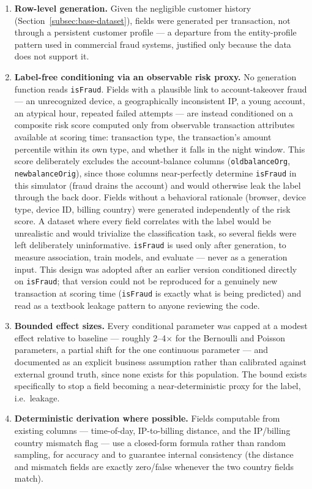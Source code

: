\begin{enumerate}
    \item \textbf{Row-level generation.} Given the negligible customer history (Section~\ref{subsec:base-dataset}), fields were generated per transaction, not through a persistent customer profile --- a departure from the entity-profile pattern used in commercial fraud systems, justified only because the data does not support it.
    \item \textbf{Label-free conditioning via an observable risk proxy.} No generation function reads \texttt{isFraud}. Fields with a plausible link to account-takeover fraud --- an unrecognized device, a geographically inconsistent IP, a young account, an atypical hour, repeated failed attempts --- are instead conditioned on a composite risk score computed only from observable transaction attributes available at scoring time: transaction type, the transaction's amount percentile within its own type, and whether it falls in the night window. This score deliberately excludes the account-balance columns (\texttt{oldbalanceOrg}, \texttt{newbalanceOrig}), since those columns near-perfectly determine \texttt{isFraud} in this simulator (fraud drains the account) and would otherwise leak the label through the back door. Fields without a behavioral rationale (browser, device type, device ID, billing country) were generated independently of the risk score. A dataset where every field correlates with the label would be unrealistic and would trivialize the classification task, so several fields were left deliberately uninformative. \texttt{isFraud} is used only after generation, to measure association, train models, and evaluate --- never as a generation input. This design was adopted after an earlier version conditioned directly on \texttt{isFraud}; that version could not be reproduced for a genuinely new transaction at scoring time (\texttt{isFraud} is exactly what is being predicted) and read as a textbook leakage pattern to anyone reviewing the code.
    \item \textbf{Bounded effect sizes.} Every conditional parameter was capped at a modest effect relative to baseline --- roughly 2--4\(\times\) for the Bernoulli and Poisson parameters, a partial shift for the one continuous parameter --- and documented as an explicit business assumption rather than calibrated against external ground truth, since none exists for this population. The bound exists specifically to stop a field becoming a near-deterministic proxy for the label, i.e.\ leakage.
    \item \textbf{Deterministic derivation where possible.} Fields computable from existing columns --- time-of-day, IP-to-billing distance, and the IP/billing country mismatch flag --- use a closed-form formula rather than random sampling, for accuracy and to guarantee internal consistency (the distance and mismatch fields are exactly zero/false whenever the two country fields match).

\end{enumerate}
